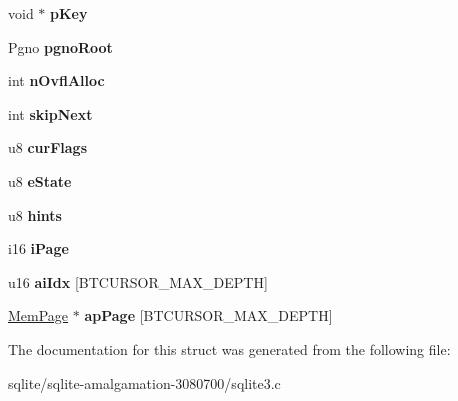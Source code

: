 \begin{DoxyCompactItemize}
\item 
\hypertarget{struct_bt_cursor_a3c979824f27f63678d7a2b02311bc330}{void $\ast$ {\bfseries p\+Key}}\label{struct_bt_cursor_a3c979824f27f63678d7a2b02311bc330}

\item 
\hypertarget{struct_bt_cursor_a0b038f63a5b1b9df0b892e0773ffdd29}{Pgno {\bfseries pgno\+Root}}\label{struct_bt_cursor_a0b038f63a5b1b9df0b892e0773ffdd29}

\item 
\hypertarget{struct_bt_cursor_a114e01e9e27ae7640796fa6258bda937}{int {\bfseries n\+Ovfl\+Alloc}}\label{struct_bt_cursor_a114e01e9e27ae7640796fa6258bda937}

\item 
\hypertarget{struct_bt_cursor_ab1dfdbd6c9ec6cdb21cdb5deaa6d5ecb}{int {\bfseries skip\+Next}}\label{struct_bt_cursor_ab1dfdbd6c9ec6cdb21cdb5deaa6d5ecb}

\item 
\hypertarget{struct_bt_cursor_ab120d81b3550eabce37f377cbdae8836}{u8 {\bfseries cur\+Flags}}\label{struct_bt_cursor_ab120d81b3550eabce37f377cbdae8836}

\item 
\hypertarget{struct_bt_cursor_a30ab5e7109965b34a08562a7b7e6de15}{u8 {\bfseries e\+State}}\label{struct_bt_cursor_a30ab5e7109965b34a08562a7b7e6de15}

\item 
\hypertarget{struct_bt_cursor_ad8c66c31cf1a2c2181d61a64ca951a8a}{u8 {\bfseries hints}}\label{struct_bt_cursor_ad8c66c31cf1a2c2181d61a64ca951a8a}

\item 
\hypertarget{struct_bt_cursor_ad4362a71baf655b0957a02324586853b}{i16 {\bfseries i\+Page}}\label{struct_bt_cursor_ad4362a71baf655b0957a02324586853b}

\item 
\hypertarget{struct_bt_cursor_a037a739198de5bee22ca203d34e90af1}{u16 {\bfseries ai\+Idx} \mbox{[}B\+T\+C\+U\+R\+S\+O\+R\+\_\+\+M\+A\+X\+\_\+\+D\+E\+P\+T\+H\mbox{]}}\label{struct_bt_cursor_a037a739198de5bee22ca203d34e90af1}

\item 
\hypertarget{struct_bt_cursor_ad3414d944f9578e86e26c6158f92096b}{\hyperlink{struct_mem_page}{Mem\+Page} $\ast$ {\bfseries ap\+Page} \mbox{[}B\+T\+C\+U\+R\+S\+O\+R\+\_\+\+M\+A\+X\+\_\+\+D\+E\+P\+T\+H\mbox{]}}\label{struct_bt_cursor_ad3414d944f9578e86e26c6158f92096b}

\end{DoxyCompactItemize}


The documentation for this struct was generated from the following file\+:\begin{DoxyCompactItemize}
\item 
sqlite/sqlite-\/amalgamation-\/3080700/sqlite3.\+c\end{DoxyCompactItemize}
